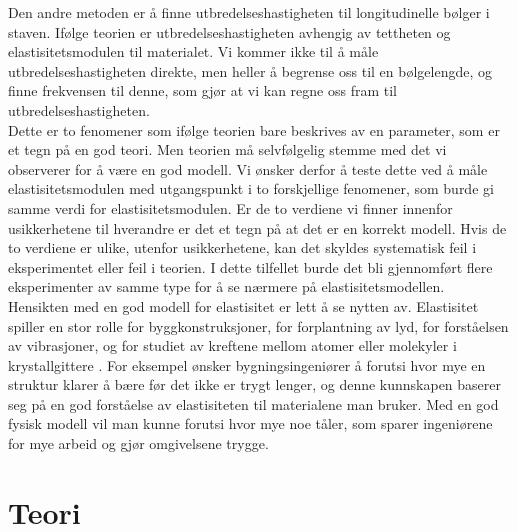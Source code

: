 \documentclass[%
 reprint,
 amsmath,amssymb,
 aps,
 norsk,
 booktabs
]{revtex4-1}
\begin{document}
Den andre metoden er å finne utbredelseshastigheten til longitudinelle bølger i staven. Ifølge teorien er utbredelseshastigheten avhengig av tettheten og elastisitetsmodulen til materialet. Vi kommer ikke til å måle utbredelseshastigheten direkte, men heller å begrense oss til en bølgelengde, og finne frekvensen til denne, som gjør at vi kan regne oss fram til utbredelseshastigheten.\\
Dette er to fenomener som ifølge teorien bare beskrives av en parameter, som er et tegn på en god teori. Men teorien må selvfølgelig stemme med det vi observerer for å være en god modell. Vi ønsker derfor å teste dette ved å måle elastisitetsmodulen med utgangspunkt i to forskjellige fenomener, som burde gi samme verdi for elastisitetsmodulen. Er de to verdiene vi finner innenfor usikkerhetene til hverandre er det et tegn på at det er en korrekt modell. Hvis de to verdiene er ulike, utenfor usikkerhetene, kan det skyldes systematisk feil i eksperimentet eller feil i teorien. I dette tilfellet burde det bli gjennomført flere eksperimenter av samme type for å se nærmere på elastisitetsmodellen.\\
Hensikten med en god modell for elastisitet er lett å se nytten av. Elastisitet spiller en stor rolle for byggkonstruksjoner, for forplantning av lyd, for forståelsen av vibrasjoner, og for studiet av kreftene mellom atomer eller molekyler i krystallgittere \cite{gronn}. For eksempel ønsker bygningsingeniører å forutsi hvor mye en struktur klarer å bære før det ikke er trygt lenger, og denne kunnskapen baserer seg på en god forståelse av elastisiteten til materialene man bruker. Med en god fysisk modell vil man kunne forutsi hvor mye noe tåler, som sparer ingeniørene for mye arbeid og gjør omgivelsene trygge.
\section{Teori}
\end{document}
